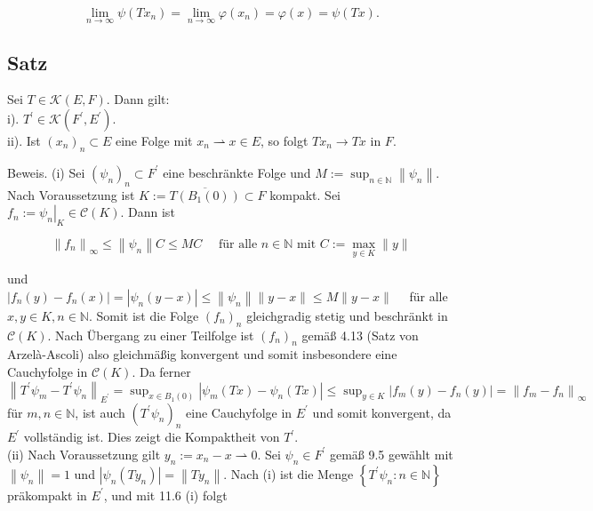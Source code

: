 \documentclass[10pt, letterpaper]{article}
\begin{document}
$$
\lim _{n \rightarrow \infty} \psi\left(T x_{n}\right)=\lim _{n \rightarrow \infty} \varphi\left(x_{n}\right)=\varphi(x)=\psi(T x) .
$$

\subsection*{Satz}
Sei $T \in \mathcal{K}(E, F)$. Dann gilt:\\
i). $T^{\prime} \in \mathcal{K}\left(F^{\prime}, E^{\prime}\right)$.\\
ii). Ist $\left(x_{n}\right)_{n} \subset E$ eine Folge mit $x_{n} \rightharpoonup x \in E$, so folgt $T x_{n} \rightarrow T x$ in $F$.

Beweis. (i) Sei $\left(\psi_{n}\right)_{n} \subset F^{\prime}$ eine beschränkte Folge und $M:=\sup _{n \in \mathbb{N}}\left\|\psi_{n}\right\|$. Nach Voraussetzung ist $K:=\overline{T\left(B_{1}(0)\right)} \subset F$ kompakt. Sei $f_{n}:=\left.\psi_{n}\right|_{K} \in \mathcal{C}(K)$. Dann ist

$$
\left\|f_{n}\right\|_{\infty} \leq\left\|\psi_{n}\right\| C \leq M C \quad \text { für alle } n \in \mathbb{N} \text { mit } C:=\max _{y \in K}\|y\|
$$

und\\
$\left|f_{n}(y)-f_{n}(x)\right|=\left|\psi_{n}(y-x)\right| \leq\left\|\psi_{n}\right\|\|y-x\| \leq M\|y-x\| \quad$ für alle $x, y \in K, n \in \mathbb{N}$. Somit ist die Folge $\left(f_{n}\right)_{n}$ gleichgradig stetig und beschränkt in $\mathcal{C}(K)$. Nach Übergang zu einer Teilfolge ist $\left(f_{n}\right)_{n}$ gemäß 4.13 (Satz von Arzelà-Ascoli) also gleichmäßig konvergent und somit insbesondere eine Cauchyfolge in $\mathcal{C}(K)$. Da ferner\\
$\left\|T^{\prime} \psi_{m}-T^{\prime} \psi_{n}\right\|_{E^{\prime}}=\sup _{x \in B_{1}(0)}\left|\psi_{m}(T x)-\psi_{n}(T x)\right| \leq \sup _{y \in K}\left|f_{m}(y)-f_{n}(y)\right|=\left\|f_{m}-f_{n}\right\|_{\infty}$\\
für $m, n \in \mathbb{N}$, ist auch $\left(T^{\prime} \psi_{n}\right)_{n}$ eine Cauchyfolge in $E^{\prime}$ und somit konvergent, da $E^{\prime}$ vollständig ist. Dies zeigt die Kompaktheit von $T^{\prime}$.\\
(ii) Nach Voraussetzung gilt $y_{n}:=x_{n}-x \rightharpoonup 0$. Sei $\psi_{n} \in F^{\prime}$ gemäß 9.5 gewählt mit $\left\|\psi_{n}\right\|=1$ und $\left|\psi_{n}\left(T y_{n}\right)\right|=\left\|T y_{n}\right\|$. Nach (i) ist die Menge $\left\{T^{\prime} \psi_{n}: n \in \mathbb{N}\right\}$ präkompakt in $E^{\prime}$, und mit 11.6 (i) folgt
\end{document}
